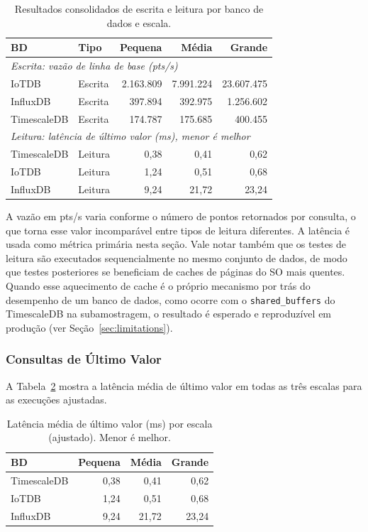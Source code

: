\begin{table}[t]
  \centering
  \caption{Resultados consolidados de escrita e leitura por banco de dados e escala.}
  \label{tab:read_write_results}
  \begin{tabular}{llrrr}
    \hline
    \textbf{BD} & \textbf{Tipo} & \textbf{Pequena} & \textbf{Média} & \textbf{Grande} \\
    \hline
    \multicolumn{5}{l}{\textit{Escrita: vazão de linha de base (pts/s)}} \\
    \hline
    IoTDB       & Escrita & 2.163.809 &  7.991.224 & 23.607.475 \\
    InfluxDB    & Escrita &   397.894 &    392.975 &  1.256.602 \\
    TimescaleDB & Escrita &   174.787 &    175.685 &    400.455 \\
    \hline
    \multicolumn{5}{l}{\textit{Leitura: latência de último valor (ms), menor é melhor}} \\
    \hline
    TimescaleDB & Leitura &  0,38 &  0,41 &  0,62 \\
    IoTDB       & Leitura &  1,24 &  0,51 &  0,68 \\
    InfluxDB    & Leitura &  9,24 & 21,72 & 23,24 \\
    \hline
  \end{tabular}
\end{table}

A vazão em pts/s varia conforme o número de pontos retornados por consulta, o que torna esse
valor incomparável entre tipos de leitura diferentes. A latência é usada como métrica
primária nesta seção. Vale notar também que os testes de leitura são executados sequencialmente
no mesmo conjunto de dados, de modo que testes posteriores se beneficiam de caches de páginas
do SO mais quentes. Quando esse aquecimento de cache é o próprio mecanismo por trás do
desempenho de um banco de dados, como ocorre com o \texttt{shared\_buffers} do TimescaleDB na
subamostragem, o resultado é esperado e reproduzível em produção (ver
Seção~\ref{sec:limitations}).

\subsubsection{Consultas de Último Valor}

A Tabela~\ref{tab:latest} mostra a latência média de último valor em todas as três escalas
para as execuções ajustadas.

\begin{table}[ht]
  \centering
  \caption{Latência média de último valor (ms) por escala (ajustado). Menor é melhor.}
  \label{tab:latest}
  \begin{tabular}{lrrr}
    \hline
    \textbf{BD} & \textbf{Pequena} & \textbf{Média} & \textbf{Grande} \\
    \hline
    TimescaleDB &  0,38 &  0,41 &  0,62 \\
    IoTDB       &  1,24 &  0,51 &  0,68 \\
    InfluxDB    &  9,24 & 21,72 & 23,24 \\
    \hline
  \end{tabular}
\end{table}

